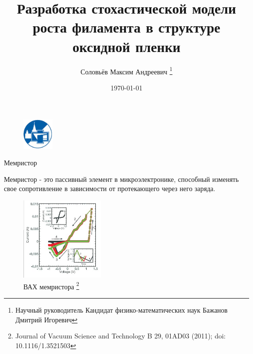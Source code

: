 \documentclass{beamer}%
\begin{document}

\title{Разработка стохастической модели роста филамента в структуре оксидной пленки}
\author{Соловьёв Максим Андреевич
\thanks{
    Научный руководитель Кандидат физико-математических наук
    Бажанов Дмитрий Игоревич}
}
\date{\today}



\begin{frame}%
\begin{figure}
    \centering
    \includegraphics[width=60px]{img/ff-sign.png}
\end{figure}
\maketitle
\end{frame}

\begin{frame}{Мемристор}
\begin{multicols}{2}
Мемристор - это пассивный элемент в микроэлектронике, способный изменять свое сопротивление в зависимости от протекающего через него заряда. 

\columnbreak
    \begin{figure}
        \centering
        \includegraphics[width=160px]{img/vac_memrister.jpg}
        \caption{ВАХ мемристора%
    \footnote{%
    Journal of Vacuum Science and Technology B 29, 01AD03 (2011); doi: 10.1116/1.3521503
    }%
    }
    \end{figure}
\end {multicols}
\end{frame}
\end{document}

